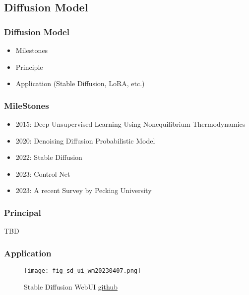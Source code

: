 \documentclass[10pt, hyperref={colorlinks=true,linkcolor=blue},xcolor=dvipsnames]{beamer}
\begin{document}
\subsection{Diffusion Model}

\begin{frame}
    \frametitle{Diffusion Model}

    \begin{itemize}
        \item Milestones
        \item Principle
        \item Application (Stable Diffusion, LoRA, etc.)
    \end{itemize}

\end{frame}

\begin{frame}
    \frametitle{MileStones}
    \begin{itemize}
        \item 2015: Deep Unsupervised Learning Using Nonequilibrium Thermodynamics \cite{sohl-dicksteinDeepUnsupervisedLearning2015}
        \item 2020: Denoising Diffusion Probabilistic Model \cite{hoDenoisingDiffusionProbabilistic2020}
        \item 2022: Stable Diffusion \cite{rombachHighResolutionImageSynthesis2022}
        \item 2023: Control Net \cite{zhangAddingConditionalControl2023}
        \item 2023: A recent Survey by Pecking University \cite{yangDiffusionModelsComprehensive2023}
    \end{itemize}
\end{frame}

\begin{frame}
    \frametitle{Principal}
    TBD
\end{frame}

\begin{frame}
    \frametitle{Application}
    \begin{figure}
        \texttt{[image: fig\_sd\_ui\_wm20230407.png]}
        \caption[short]{Stable Diffusion WebUI \href{https://github.com/AUTOMATIC1111/stable-diffusion-webui}{github}}
    \end{figure}
\end{frame}
\end{document}
